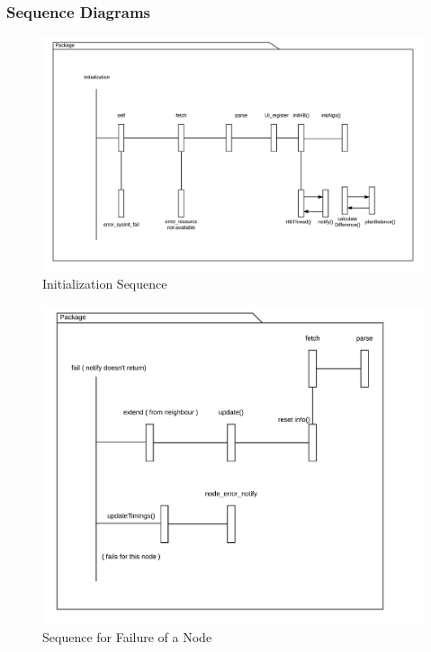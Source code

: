 \documentclass[12pt,a4paper,final]{report}
\begin{document}
\subsubsection{Sequence Diagrams}
	\begin{figure}[!h]
		\begin{center}
			\includegraphics[scale=0.6]{Diagrams/Old Diagrams/First_Sequence.jpeg}
		\end{center}
		\caption{Initialization Sequence}
	\end{figure}
	\begin{figure}[!h]
		\begin{center}
			\includegraphics[scale=0.6]{Diagrams/Old Diagrams/Error_Sequence.jpeg}
		\end{center}
		\caption{Sequence for Failure of a Node}
	\end{figure}
\end{document}
